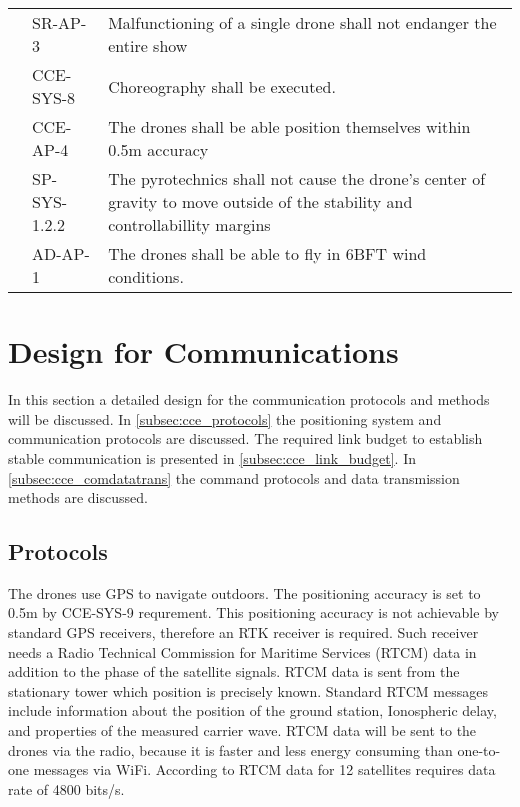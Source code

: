 \begin{longtable}{|p{2.5cm}|p{2cm}|p{10cm}|}
\multicolumn{1}{|c|}{} & SR-AP-3 & Malfunctioning of a single drone shall not endanger the entire   show \\ \cline{2-3} 
\multicolumn{1}{|c|}{} & CCE-SYS-8 & Choreography shall be executed. \\ \cline{2-3} 
\multicolumn{1}{|c|}{} & CCE-AP-4 & The drones shall be able position themselves within 0.5m   accuracy \\ \cline{2-3} 
\multicolumn{1}{|c|}{} & SP-SYS-1.2.2 & The pyrotechnics shall not cause the drone's center of gravity to move   outside of the stability and controllabillity margins \\ \cline{2-3} 
\multicolumn{1}{|c|}{} & AD-AP-1 & The drones shall be able to fly in 6BFT wind conditions. \\ \hline
\end{longtable}

\section{Design for Communications}
\label{sec:cce_communication}
In this section a detailed design for the communication protocols and methods will be discussed. In \autoref{subsec:cce_protocols} the positioning system and communication protocols are discussed. The required link budget to establish stable communication is presented in \autoref{subsec:cce_link_budget}. In \autoref{subsec:cce_comdatatrans} the command protocols and data transmission methods are discussed.

\subsection{Protocols}
\label{subsec:cce_protocols}

The drones use GPS to navigate outdoors. The positioning accuracy is set to 0.5m by CCE-SYS-9 requrement. This positioning accuracy is not achievable by standard GPS receivers, therefore an RTK receiver is required. Such receiver needs a Radio Technical Commission for Maritime Services (RTCM) data in addition to the phase of the satellite signals. RTCM data is sent from the stationary tower which position is precisely known. Standard RTCM messages include information about the position of the ground station, Ionospheric delay, and properties of the measured carrier wave. 
RTCM data will be sent to the drones via the radio, because it is faster and less energy consuming than one-to-one messages via WiFi. According to \cite{RTCM} RTCM data for 12 satellites requires data rate of 4800 bits/s.

